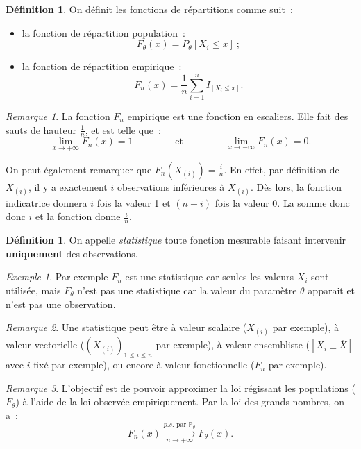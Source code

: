 \documentclass{report}
\renewcommand{\P}{\mathbb P}
\newcommand{\minfty}{{-\infty}}
\newcommand{\pinfty}{{+\infty}}
\theoremstyle{definition}
\newtheorem{déf}[thm]{Définition}
\theoremstyle{remark}
\newtheorem*{rmq}{Remarque}
\newtheorem{ex}{Exemple}[chapter]
\begin{document}
		\begin{déf} On définit les fonctions de répartitions comme suit~:
		\begin{itemize}
			\item la fonction de répartition population~:
			      \[F_\theta(x) = P_\theta[X_i \leq x]~;\]
			\item la fonction de répartition empirique~:
			      \[F_n(x) = \frac 1n\sum_{i=1}^nI_{[X_i \leq x]}.\]
		\end{itemize}
		\end{déf}

		\begin{rmq} La fonction $F_n$ empirique est une fonction en escaliers. Elle fait des sauts de hauteur $\frac 1n$, et est telle que~:
		\[\lim_{x \to \pinfty}F_n(x) = 1\qquad\qquad \text{ et } \qquad\qquad \lim_{x \to \minfty}F_n(x) = 0.\]

		On peut également remarquer que $F_n(X_{(i)}) = \frac in$. En effet, par définition de $X_{(i)}$, il y a exactement $i$ observations inférieures à
		$X_{(i)}$. Dès lors, la fonction indicatrice donnera $i$ fois la valeur 1 et $(n-i)$ fois la valeur 0. La somme donc donc $i$ et la fonction donne
		$\frac in$. \end{rmq}

		\begin{déf} On appelle \textit{statistique} toute fonction mesurable faisant intervenir \textbf{uniquement} des observations. \end{déf}

		\begin{ex} Par exemple $F_n$ est une statistique car seules les valeurs $X_i$ sont utilisée, mais $F_\theta$ n'est pas une statistique car la valeur
		du paramètre $\theta$ apparait et n'est pas une observation. \end{ex}

		\begin{rmq} Une statistique peut être à valeur scalaire ($X_{(i)}$ par exemple), à valeur vectorielle ($\left(X_{(i)}\right)_{1 \leq i \leq n}$ par
		exemple), à valeur ensembliste ($[X_i \pm \overline X]$ avec $i$ fixé par exemple), ou encore à valeur fonctionnelle ($F_n$ par exemple). \end{rmq}

		\begin{rmq} L'objectif est de pouvoir approximer la loi régissant les populations ($F_\theta$) à l'aide de la loi observée empiriquement. Par la loi
		des grands nombres, on a~:
		\[F_n(x) \xrightarrow[n \to \pinfty]{p.s. \text{ par } \P_\theta} F_\theta(x).\]
		\end{rmq}
\end{document}
